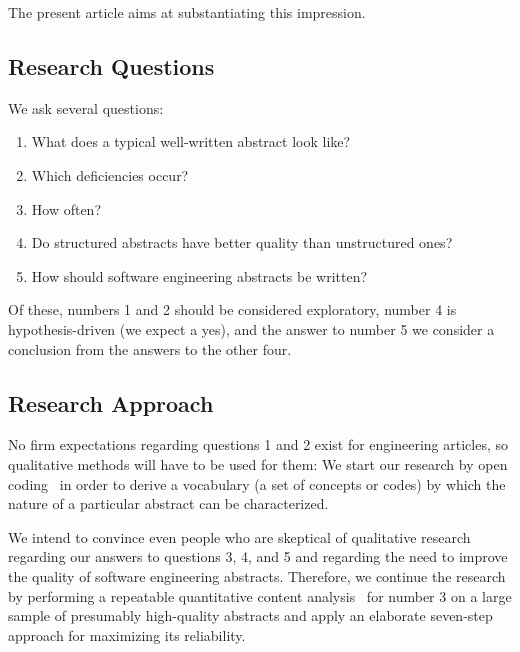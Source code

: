 \documentclass[10pt,journal,compsoc]{IEEEtran}
\begin{document}
The present article aims at substantiating this impression.




\subsection{Research Questions}

\noindent 
We ask several questions:
\begin{enumerate}
	\item What does a typical well-written abstract look like?
	\item Which deficiencies occur? 
	\item How often?
	\item Do structured abstracts have better quality than unstructured ones?
	\item How should software engineering abstracts be written?
\end{enumerate}
Of these, numbers 1 and 2 should be considered exploratory,
number 4 is hypothesis-driven (we expect a yes), and
the answer to number 5 we consider a conclusion from the answers to the other four. 


\subsection{Research Approach}

No firm expectations regarding questions 1 and 2 exist for engineering articles,
so qualitative methods will have to be used for them:
We start our research by open coding~\cite{StrCor90} in order to derive a vocabulary (a set of concepts or codes)
by which the nature of a particular abstract can be characterized.

We intend to convince even people who are skeptical of qualitative research
regarding our answers to questions 3, 4, and 5 and regarding the need to improve
the quality of software engineering abstracts.
Therefore, we continue the research by performing a repeatable
quantitative content analysis~\cite[Chapter 7]{Krippendorff04} for number 3
on a large sample of presumably high-quality abstracts
and apply an elaborate seven-step approach for maximizing its reliability.
\end{document}
